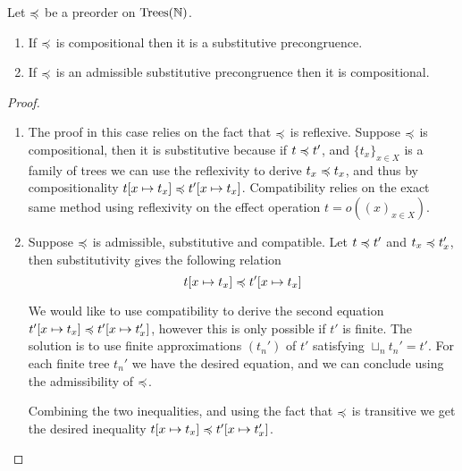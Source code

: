 \begin{proposition} Let $\preccurlyeq$ be a preorder  on $\textnormal{Trees}(\mathbb{N})$.
\begin{enumerate} 
\item If  $\preccurlyeq$ is compositional then it is a substitutive precongruence.
\item If $\preccurlyeq$ is an admissible substitutive precongruence then it is compositional.
\end{enumerate}
\end{proposition}

\noindent
{}
\begin{proof}
    \begin{enumerate}
        \item 
            The proof in this case relies on the fact that $\preccurlyeq$ is reflexive.
            Suppose $\preccurlyeq$ is compositional, then 
            it is substitutive because if $t \preccurlyeq t'$, and $\{ t_x \}_{x
            \in X}$ is a family of trees we can use the reflexivity to derive 
            $t_x \preccurlyeq t_x$, and thus 
            by compositionality $t[ x \mapsto t_x] \preccurlyeq t'[x \mapsto t_x]$.
            Compatibility relies on the exact same method using reflexivity on 
            the effect operation $t = o((x)_{x \in X})$.

        \item 
            Suppose $\preccurlyeq$ is admissible, substitutive and compatible. 
            Let $t \preccurlyeq t'$ and $t_x \preccurlyeq t_x'$, then substitutivity 
            gives the following relation 
            \begin{equation}
                t[x \mapsto t_x] \preccurlyeq t'[x \mapsto t_x]
            \end{equation}

            We would like to use compatibility to derive 
            the second equation $t'[x \mapsto t_x] \preccurlyeq t'[x \mapsto
            t_x']$, however this is only possible if $t'$ is finite. 
            The solution is to use finite approximations $(t_n')$ of $t'$
            satisfying $\sqcup_n t_n' = t'$. For each finite tree $t_n'$
            we have the desired equation, and we can conclude using 
            the admissibility of $\preccurlyeq$.

            Combining the two inequalities, and using the fact that 
            $\preccurlyeq$ is transitive we get the desired inequality
            $t[x \mapsto t_x] \preccurlyeq t'[x \mapsto t_x']$.
    \end{enumerate}
\end{proof}



